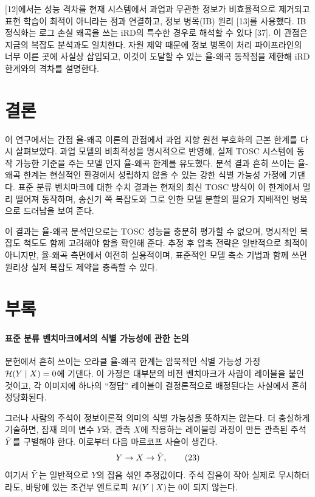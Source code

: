 [12]에서는 성능 격차를 현재 시스템에서 과업과 무관한 정보가 비효율적으로 제거되고 표현 학습이 최적이 아니라는 점과 연결하고, 정보 병목(IB) 원리 [13]를 사용했다. IB 정식화는 로그 손실 왜곡을 쓰는 iRD의 특수한 경우로 해석할 수 있다 [37]. 이 관점은 지금의 복잡도 분석과도 일치한다. 자원 제약 때문에 정보 병목이 처리 파이프라인의 너무 이른 곳에 사실상 삽입되고, 이것이 도달할 수 있는 율-왜곡 동작점을 제한해 iRD 한계와의 격차를 설명한다.

\section{결론}
이 연구에서는 간접 율-왜곡 이론의 관점에서 과업 지향 원천 부호화의 근본 한계를 다시 살펴보았다. 과업 모델의 비최적성을 명시적으로 반영해, 실제 TOSC 시스템에 동작 가능한 기준을 주는 모델 인지 율-왜곡 한계를 유도했다. 분석 결과 흔히 쓰이는 율-왜곡 한계는 현실적인 환경에서 성립하지 않을 수 있는 강한 식별 가능성 가정에 기댄다. 표준 분류 벤치마크에 대한 수치 결과는 현재의 최신 TOSC 방식이 이 한계에서 멀리 떨어져 동작하며, 송신기 쪽 복잡도와 그로 인한 모델 분할의 필요가 지배적인 병목으로 드러남을 보여 준다.

이 결과는 율-왜곡 분석만으로는 TOSC 성능을 충분히 평가할 수 없으며, 명시적인 복잡도 척도도 함께 고려해야 함을 확인해 준다. 추정 후 압축 전략은 일반적으로 최적이 아니지만, 율-왜곡 측면에서 여전히 실용적이며, 표준적인 모델 축소 기법과 함께 쓰면 원리상 실제 복잡도 제약을 충족할 수 있다.

\appendix
\renewcommand{\thesection}{}
\section*{부록}
\paragraph{표준 분류 벤치마크에서의 식별 가능성에 관한 논의}
문헌에서 흔히 쓰이는 오라클 율-왜곡 한계는 암묵적인 식별 가능성 가정 $\mathcal{H}(Y\mid X)=0$에 기댄다. 이 가정은 대부분의 비전 벤치마크가 사람이 레이블을 붙인 것이고, 각 이미지에 하나의 ``정답'' 레이블이 결정론적으로 배정된다는 사실에서 흔히 정당화된다.

그러나 사람의 주석이 정보이론적 의미의 식별 가능성을 뜻하지는 않는다. 더 충실하게 기술하면, 잠재 의미 변수 $Y$와, 관측 $X$에 작용하는 레이블링 과정이 만든 관측된 주석 $\tilde{Y}$를 구별해야 한다. 이로부터 다음 마르코프 사슬이 생긴다.
\begin{equation}
Y\to X\to\tilde{Y},\tag{23}
\end{equation}
여기서 $\tilde{Y}$는 일반적으로 $Y$의 잡음 섞인 추정값이다. 주석 잡음이 작아 실제로 무시하더라도, 바탕에 있는 조건부 엔트로피 $\mathcal{H}(Y\mid X)$는 0이 되지 않는다.

